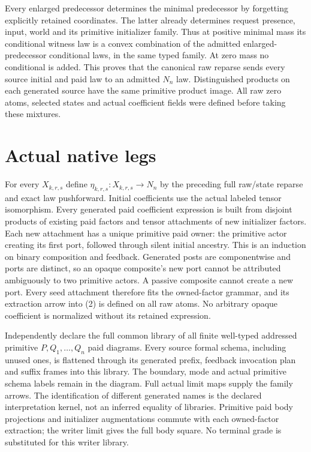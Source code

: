 \documentclass[11pt]{article}\usepackage{amsmath,amssymb,amsthm,geometry}\geometry{margin=1in}\newtheorem{definition}{Definition}\newtheorem{theorem}[definition]{Theorem}
\begin{document}
Every enlarged predecessor determines the minimal predecessor by forgetting explicitly retained coordinates. The latter already determines request presence, input, world and its primitive initializer family. Thus at positive minimal mass its conditional witness law is a convex combination of the admitted enlarged-predecessor conditional laws, in the same typed family. At zero mass no conditional is added. This proves that the canonical raw reparse sends every source initial and paid law to an admitted $N_n$ law. Distinguished products on each generated source have the same primitive product image. All raw zero atoms, selected states and actual coefficient fields were defined before taking these mixtures.

\section{Actual native legs}
For every $X_{k,r,s}$ define $\eta_{k,r,s}:X_{k,r,s}\to N_n$ by the preceding full raw/state reparse and exact law pushforward. Initial coefficients use the actual labeled tensor isomorphism. Every generated paid coefficient expression is built from disjoint products of existing paid factors and tensor attachments of new initializer factors. Each new attachment has a unique primitive paid owner: the primitive actor creating its first port, followed through silent initial ancestry. This is an induction on binary composition and feedback. Generated posts are componentwise and ports are distinct, so an opaque composite's new port cannot be attributed ambiguously to two primitive actors. A passive composite cannot create a new port. Every seed attachment therefore fits the owned-factor grammar, and its extraction arrow into (2) is defined on all raw atoms. No arbitrary opaque coefficient is normalized without its retained expression.

Independently declare the full common library of all finite well-typed addressed primitive $P,Q_1,\ldots,Q_n$ paid diagrams. Every source formal schema, including unused ones, is flattened through its generated prefix, feedback invocation plan and suffix frames into this library. The boundary, mode and actual primitive schema labels remain in the diagram. Full actual limit maps supply the family arrows. The identification of different generated names is the declared interpretation kernel, not an inferred equality of libraries. Primitive paid body projections and initializer augmentations commute with each owned-factor extraction; the writer limit gives the full body square. No terminal grade is substituted for this writer library.
\end{document}
